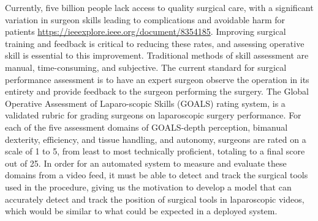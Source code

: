 Currently, five billion people lack access to quality surgical care, with a significant variation in surgeon skills leading to complications and avoidable harm for patients \url{https://ieeexplore.ieee.org/document/8354185}. Improving surgical training and feedback is critical to reducing these rates, and assessing operative skill is essential to this improvement. Traditional methods of skill assessment are manual, time-consuming, and subjective. The current standard for surgical performance assessment is to have an expert surgeon observe the operation in its entirety and provide feedback to the surgeon performing the surgery. The Global Operative Assessment of Laparo-scopic Skills (GOALS) rating system, is a validated rubric for grading surgeons on laparoscopic surgery performance. For each of the five assessment domains of GOALS-depth perception, bimanual dexterity, efficiency, and tissue handling, and autonomy, surgeons are rated on a scale of 1 to 5, from least to most technically proficient, totaling to a final score out of 25. In order for an automated system to measure and evaluate these domains from a video feed, it must be able to detect and track the surgical tools used in the procedure, giving us the motivation to develop a model that can accurately detect and track the position of surgical tools in laparoscopic videos, which would be similar to what could be expected in a deployed system.




